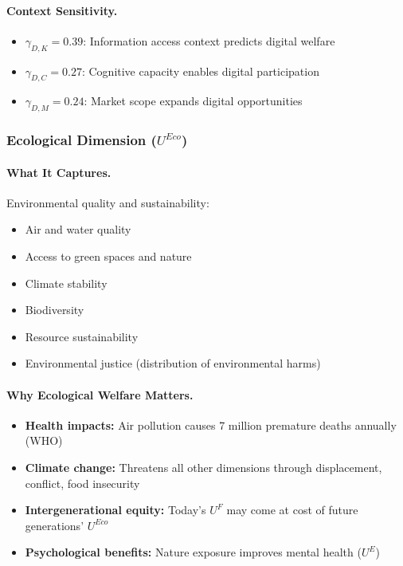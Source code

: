 \paragraph{Context Sensitivity.}
\begin{itemize}
\item $\gamma_{D,K} = 0.39$: Information access context predicts digital welfare
\item $\gamma_{D,C} = 0.27$: Cognitive capacity enables digital participation
\item $\gamma_{D,M} = 0.24$: Market scope expands digital opportunities
\end{itemize}

\subsubsection{Ecological Dimension ($U^{Eco}$)}

\paragraph{What It Captures.}
Environmental quality and sustainability:
\begin{itemize}
\item Air and water quality
\item Access to green spaces and nature
\item Climate stability
\item Biodiversity
\item Resource sustainability
\item Environmental justice (distribution of environmental harms)
\end{itemize}

\paragraph{Why Ecological Welfare Matters.}
\begin{itemize}
\item \textbf{Health impacts:} Air pollution causes 7 million premature deaths 
annually (WHO)
\item \textbf{Climate change:} Threatens all other dimensions through 
displacement, conflict, food insecurity
\item \textbf{Intergenerational equity:} Today's $U^F$ may come at cost of 
future generations' $U^{Eco}$
\item \textbf{Psychological benefits:} Nature exposure improves mental health ($U^E$)
\end{itemize}

